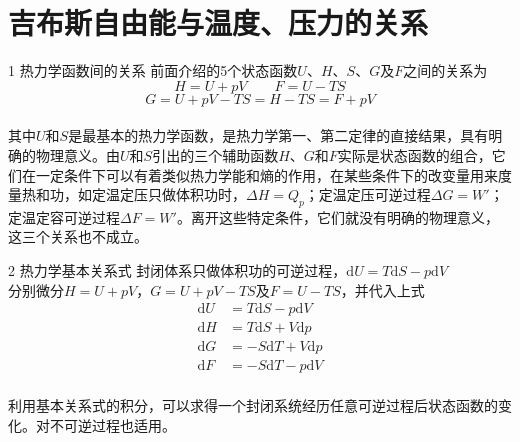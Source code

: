 \section{吉布斯自由能与温度、压力的关系}


\begin{frame}{1 热力学函数间的关系}
    前面介绍的5个状态函数$U$、$H$、$S$、$G$及$F$之间的关系为
    $$H=U+pV \qquad F=U-TS$$
    $$G=U+pV-TS=H-TS=F+pV$$
    \\其中$U$和$S$是最基本的热力学函数，是热力学第一、第二定律的直接结果，具有明确的物理意义。由$U$和$S$引出的三个辅助函数$H$、$G$和$F$实际是状态函数的组合，它们在一定条件下可以有着类似热力学能和熵的作用，在某些条件下的改变量用来度量热和功，如定温定压只做体积功时，$\Delta H = Q_p$；定温定压可逆过程$\Delta G = W'$；定温定容可逆过程$\Delta F = W'$。离开这些特定条件，它们就没有明确的物理意义，这三个关系也不成立。
\end{frame}


\begin{frame}{2 热力学基本关系式}
    封闭体系只做体积功的可逆过程，$\mathrm{d}U=T\mathrm{d}S-p\mathrm{d}V$
    \\分别微分$H=U+pV$，$G=U+pV-TS$及$F=U-TS$，并代入上式
    $$\begin{aligned}
        \mathrm{d}U&=T\mathrm{d}S-p\mathrm{d}V \\
        \mathrm{d}H&=T\mathrm{d}S+V\mathrm{d}p \\
        \mathrm{d}G&=-S\mathrm{d}T+V\mathrm{d}p \\
        \mathrm{d}F&=-S\mathrm{d}T-p\mathrm{d}V
    \end{aligned}$$
    \\利用基本关系式的积分，可以求得一个封闭系统经历任意可逆过程后状态函数的变化。对不可逆过程也适用。  
\end{frame}


